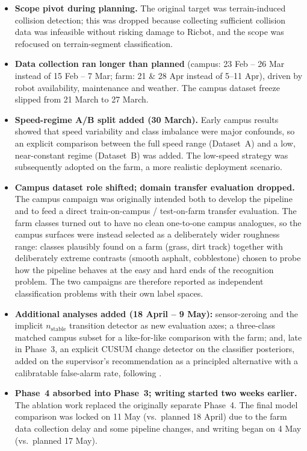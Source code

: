 \begin{itemize}
    \setlength{\itemsep}{2pt}
    \item \textbf{Scope pivot during planning.} The original target was terrain-induced collision detection; this was dropped because collecting sufficient collision data was  infeasible without risking damage to Ricbot, and the scope was refocused on terrain-segment classification.
    \item \textbf{Data collection ran longer than planned} (campus: 23 Feb – 26 Mar instead of 15 Feb – 7 Mar; farm: 21 \& 28 Apr instead of 5–11 Apr), driven by robot availability, maintenance and weather. The campus dataset freeze slipped from 21 March to 27 March.
    \item \textbf{Speed-regime A/B split added (30 March).} Early campus results showed that speed variability and class imbalance were major confounds, so an explicit comparison between the full speed range (Dataset~A) and a low, near-constant regime (Dataset~B) was added. The low-speed strategy was subsequently adopted on the farm, a more realistic deployment scenario.
    \item \textbf{Campus dataset role shifted; domain transfer evaluation dropped.} The campus campaign was originally intended both to develop the pipeline and to feed a direct train-on-campus / test-on-farm transfer evaluation. The farm classes turned out to have no clean one-to-one campus analogues, so the campus surfaces were instead selected as a deliberately wider roughness range: classes plausibly found on a farm (grass, dirt track) together with deliberately extreme contrasts (smooth asphalt, cobblestone) chosen to probe how the pipeline behaves at the easy and hard ends of the recognition problem. The two campaigns are therefore reported as independent classification problems with their own label spaces.
     \item \textbf{Additional analyses added (18 April – 9 May):} sensor-zeroing and the implicit $n_{\text{stable}}$ transition detector as new evaluation axes; a three-class matched campus subset for a like-for-like comparison with the farm; and, late in Phase~3, an explicit CUSUM change detector on the classifier posteriors, added on the supervisor's recommendation as a principled alternative with a calibratable false-alarm rate, following \cite[\S6.4]{Blanke2003}.
    \item \textbf{Phase~4 absorbed into Phase~3; writing started two weeks earlier.} The ablation work replaced the originally separate Phase~4. The final model comparison was locked on 11 May (vs.\ planned 18 April) due to the farm data collection delay and some pipeline changes, and writing began on 4 May (vs.\ planned 17 May).
\end{itemize}


